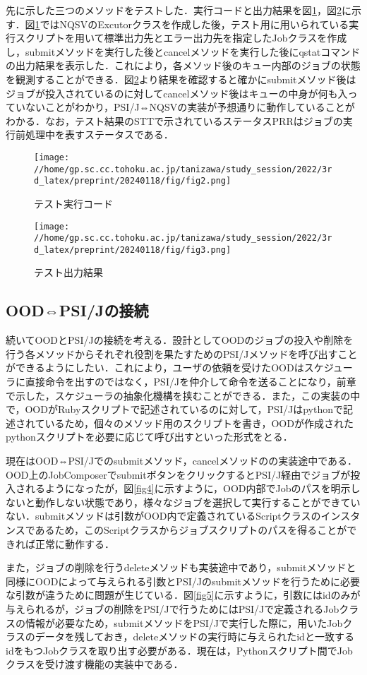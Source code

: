 \documentclass[a4paper,oneside,twocolumn,notitlepage,dvipdfmx]{jsarticle}
\begin{document}
先に示した三つのメソッドをテストした．実行コードと出力結果を図\ref{fig2}，図\ref{fig3}に示す．図\ref{fig2}ではNQSVのExcutorクラスを作成した後，テスト用に用いられている実行スクリプトを用いて標準出力先とエラー出力先を指定したJobクラスを作成し，submitメソッドを実行した後とcancelメソッドを実行した後にqstatコマンドの出力結果を表示した．これにより，各メソッド後のキュー内部のジョブの状態を観測することができる．図\ref{fig3}より結果を確認すると確かにsubmitメソッド後はジョブが投入されているのに対してcancelメソッド後はキューの中身が何も入っていないことがわかり，PSI/J⇔NQSVの実装が予想通りに動作していることがわかる．なお，テスト結果のSTTで示されているステータスPRRはジョブの実行前処理中を表すステータスである．

\begin{figure}[h]
  \centering
  \texttt{[image: //home/gp.sc.cc.tohoku.ac.jp/tanizawa/study\_session/2022/3rd\_latex/preprint/20240118/fig/fig2.png]}
  \caption{テスト実行コード}
  \label{fig2}
\end{figure}

\begin{figure}[h]
  \centering
  \texttt{[image: //home/gp.sc.cc.tohoku.ac.jp/tanizawa/study\_session/2022/3rd\_latex/preprint/20240118/fig/fig3.png]}
  \caption{テスト出力結果}
  \label{fig3}
\end{figure}

\subsection{OOD⇔PSI/Jの接続}
続いてOODとPSI/Jの接続を考える．設計としてOODのジョブの投入や削除を行う各メソッドからそれぞれ役割を果たすためのPSI/Jメソッドを呼び出すことができるようにしたい．これにより，ユーザの依頼を受けたOODはスケジューラに直接命令を出すのではなく，PSI/Jを仲介して命令を送ることになり，前章で示した，スケジューラの抽象化機構を挟むことができる．また，この実装の中で，OODがRubyスクリプトで記述されているのに対して，PSI/Jはpythonで記述されているため，個々のメソッド用のスクリプトを書き，OODが作成されたpythonスクリプトを必要に応じて呼び出すといった形式をとる．\par
現在はOOD⇔PSI/Jでのsubmitメソッド，cancelメソッドのの実装途中である．OOD上のJobComposerでsubmitボタンをクリックするとPSI/J経由でジョブが投入されるようになったが，図\ref{fig4}に示すように，OOD内部でJobのパスを明示しないと動作しない状態であり，様々なジョブを選択して実行することができていない．submitメソッドは引数がOOD内で定義されているScriptクラスのインスタンスであるため，このScriptクラスからジョブスクリプトのパスを得ることができれば正常に動作する．\par
また，ジョブの削除を行うdeleteメソッドも実装途中であり，submitメソッドと同様にOODによって与えられる引数とPSI/Jのsubmitメソッドを行うために必要な引数が違うために問題が生じている．図\ref{fig5}に示すように，引数にはidのみが与えられるが，ジョブの削除をPSI/Jで行うためにはPSI/Jで定義されるJobクラスの情報が必要なため，submitメソッドをPSI/Jで実行した際に，用いたJobクラスのデータを残しておき，deleteメソッドの実行時に与えられたidと一致するidをもつJobクラスを取り出す必要がある．現在は，Pythonスクリプト間でJobクラスを受け渡す機能の実装中である．\par 
\end{document}
